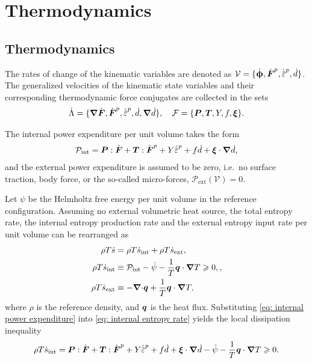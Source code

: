 \section{Thermodynamics}
\label{section: framework/thermodynamics}

\subsection{Thermodynamics}
\label{s: theory/thermodynamics}

The rates of change of the kinematic variables are denoted as $\mathcal{V} = \{ \dot{\bs{\upphi}}, \dot{\defgrad}^p, \epdot, \dot{d} \}$. The generalized velocities of the kinematic state variables and their corresponding thermodynamic force conjugates are collected in the sets
\begin{align}
  \dot{\Lambda} = \{ \grad \dot{\defgrad}, \dot{\defgrad}^p, \epdot, \dot{d}, \grad \dot{d} \}, \quad \mathcal{F} = \{ \bfP, \bfT, Y, f, \bs{\xi} \}.
\end{align}

The internal power expenditure per unit volume takes the form
\begin{align}
  \mathcal{P}_\text{int} = \bfP:\dot{\bfF} + \bfT:\dot{\defgrad}^p + Y\epdot + f\dot{d} + \bs{\xi}\cdot\grad\dot{d}, \label{eq: internal power expenditure}
\end{align}
and the external power expenditure is assumed to be zero, i.e.\ no surface traction, body force, or the so-called micro-forces, $\mathcal{P}_\text{ext}(\mathcal{V}) = 0$.

Let $\psi$ be the Helmholtz free energy per unit volume in the reference configuration. Assuming no external volumetric heat source, the total entropy rate, the internal entropy production rate and the external entropy input rate per unit volume can be rearranged as
\begin{subequations}
  \begin{align}
    \rho T \dot{s}            & = \rho T \dot{s}_\text{int} + \rho T \dot{s}_\text{ext}, \label{eq: entropy rate}                                         \\
    \rho T \dot{s}_\text{int} & \equiv \mathcal{P}_\text{int} - \dot{\psi} - \dfrac{1}{T}\boldsymbol{q}\cdot\boldsymbol{\nabla} T \geqslant 0, \label{eq: internal entropy rate}, \\
    \rho T \dot{s}_\text{ext} & \equiv - {\boldsymbol{\nabla} \cdot} \boldsymbol{q} + \dfrac{1}{T}\boldsymbol{q}\cdot\boldsymbol{\nabla} T, \label{eq: external entropy rate}
  \end{align}
\end{subequations}
where $\rho$ is the reference density, and $\boldsymbol{q}$ is the heat flux. Substituting \eqref{eq: internal power expenditure} into \eqref{eq: internal entropy rate} yields the local dissipation inequality
\begin{align}
  \rho T \dot{s}_\text{int} = \bfP:\dot{\bfF} + \bfT:\dot{\defgrad}^p + Y\epdot + f\dot{d} + \bs{\xi}\cdot\grad\dot{d} - \dot{\psi} - \dfrac{1}{T}\bfq\cdot\grad T \geqslant 0. \label{eq: dissipation inequality 1}
\end{align}


